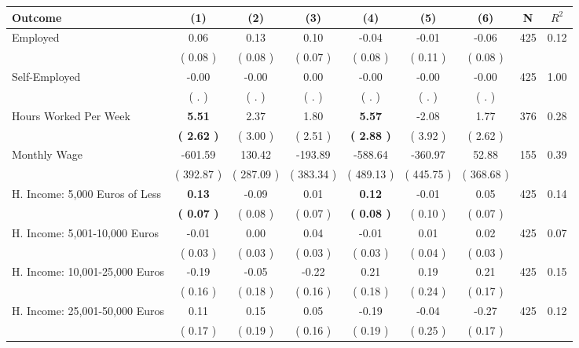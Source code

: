 \begin{tabular}{lcccccccc}
\toprule
 \textbf{Outcome} & \textbf{(1)} & \textbf{(2)} & \textbf{(3)} & \textbf{(4)} & \textbf{(5)} & \textbf{(6)} & \textbf{N} & \textbf{$ R^2$} \\
\midrule
Employed &      0.06 &      0.13 &      0.10 &     -0.04 &     -0.01 &     -0.06 & 425 &       0.12 \\ 
 & (     0.08 ) & (     0.08 ) & (     0.07 ) & (     0.08 ) & (     0.11 ) & (     0.08 ) & \\
Self-Employed &     -0.00 &     -0.00 &      0.00 &     -0.00 &     -0.00 &     -0.00 & 425 &       1.00 \\ 
 & (        . ) & (        . ) & (        . ) & (        . ) & (        . ) & (        . ) & \\
Hours Worked Per Week & \textbf{     5.51} &      2.37 &      1.80 & \textbf{     5.57} &     -2.08 &      1.77 & 376 &       0.28 \\ 
 & \textbf{(     2.62 )} & (     3.00 ) & (     2.51 ) & \textbf{(     2.88 )} & (     3.92 ) & (     2.62 ) & \\
Monthly Wage &   -601.59 &    130.42 &   -193.89 &   -588.64 &   -360.97 &     52.88 & 155 &       0.39 \\ 
 & (   392.87 ) & (   287.09 ) & (   383.34 ) & (   489.13 ) & (   445.75 ) & (   368.68 ) & \\
H. Income: 5,000 Euros of Less & \textbf{     0.13} &     -0.09 &      0.01 & \textbf{     0.12} &     -0.01 &      0.05 & 425 &       0.14 \\ 
 & \textbf{(     0.07 )} & (     0.08 ) & (     0.07 ) & \textbf{(     0.08 )} & (     0.10 ) & (     0.07 ) & \\
H. Income: 5,001-10,000 Euros &     -0.01 &      0.00 &      0.04 &     -0.01 &      0.01 &      0.02 & 425 &       0.07 \\ 
 & (     0.03 ) & (     0.03 ) & (     0.03 ) & (     0.03 ) & (     0.04 ) & (     0.03 ) & \\
H. Income: 10,001-25,000 Euros &     -0.19 &     -0.05 &     -0.22 &      0.21 &      0.19 &      0.21 & 425 &       0.15 \\ 
 & (     0.16 ) & (     0.18 ) & (     0.16 ) & (     0.18 ) & (     0.24 ) & (     0.17 ) & \\
H. Income: 25,001-50,000 Euros &      0.11 &      0.15 &      0.05 &     -0.19 &     -0.04 &     -0.27 & 425 &       0.12 \\ 
 & (     0.17 ) & (     0.19 ) & (     0.16 ) & (     0.19 ) & (     0.25 ) & (     0.17 ) & \\

\end{tabular}
